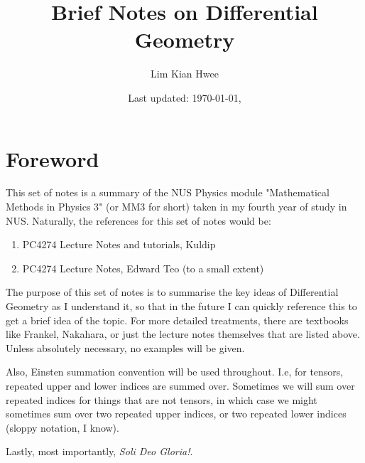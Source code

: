 \documentclass[a4paper,12pt,oneside,onecolumn,final]{memoir} %
\title{Brief Notes on Differential Geometry}
\author{Lim Kian Hwee}
\date{\small Last updated: \today, \currenttime} %
\numberwithin{equation}{chapter} %
\theoremstyle{plain}
\theoremstyle{remark}
\theoremstyle{plain}
\theoremstyle{definition}
\theoremstyle{remark}
\begin{document}
  \frontmatter
  \maketitle
  \begin{KeepFromToc}
    \tableofcontents %
  \end{KeepFromToc}
  \chapter{Foreword}
    This set of notes is a summary of the NUS Physics module "Mathematical
    Methods in Physics 3" (or MM3 for short) taken in my fourth year of study
    in NUS. Naturally, the references for this set of notes would be:
    \begin{enumerate}
      \item{PC4274 Lecture Notes and tutorials, Kuldip}
      \item{PC4274 Lecture Notes, Edward Teo (to a small extent)}
    \end{enumerate}
    The purpose of this set of notes is to summarise the key ideas of
    Differential Geometry as I understand it, so that in the future I can
    quickly reference this to get a brief idea of the topic. For more
    detailed treatments, there are textbooks like Frankel, Nakahara, or just
    the lecture notes themselves that are listed above. Unless absolutely
    necessary, no examples will be given.

    Also, Einsten summation convention will be used throughout. I.e, for
    tensors, repeated upper and lower indices are summed over. Sometimes we
    will sum over repeated indices for things that are not tensors, in which case we might sometimes sum over two repeated upper indices, or two repeated lower indices (sloppy notation, I know).

    Lastly, most importantly, \emph{Soli Deo Gloria!}.

  \mainmatter
    
    
    
    
    
    
    
    
  
\end{document}
